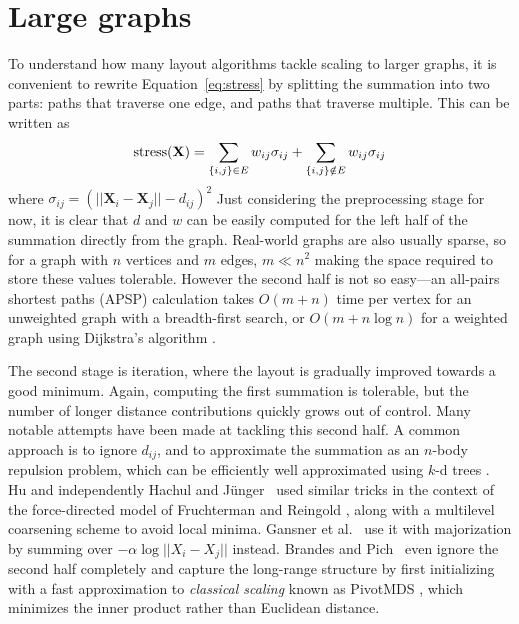 \section{Large graphs}
\label{sec:large_graphs}
To understand how many layout algorithms tackle scaling to larger graphs, it is convenient to rewrite Equation~\eqref{eq:stress} by splitting the summation into two parts: paths that traverse one edge, and paths that traverse multiple.
This can be written as
\begin{equation}
  \text{stress}(\mathbf{X}) = \sum_{\{i,j\}\in E}w_{ij}\sigma_{ij}\\
  + \sum_{\{i,j\}\notin E}w_{ij}\sigma_{ij}
  \label{split stress}
\end{equation}
where $\sigma_{ij} = (||\mathbf{X}_i - \mathbf{X}_j|| - d_{ij})^2$
Just considering the preprocessing stage for now, it is clear that $d$ and $w$ can be easily computed for the left half of the summation directly from the graph. Real-world graphs are also usually sparse, so for a graph with $n$ vertices and $m$ edges, $m \ll n^2$ making the space required to store these values tolerable. However the second half is not so easy---an all-pairs shortest paths (APSP) calculation takes $O(m + n)$ time per vertex for an unweighted graph with a breadth-first search, or $O(m + n\log n)$ for a weighted graph using Dijkstra's algorithm \cite{Cormen2009}.

The second stage is iteration, where the layout is gradually improved towards a good minimum. Again, computing the first summation is tolerable, but the number of longer distance contributions quickly grows out of control. Many notable attempts have been made at tackling this second half. A common approach is to ignore $d_{ij}$, and to approximate the summation as an $n$-body repulsion problem, which can be efficiently well approximated using $k$-d trees \cite{Barnes1986}. Hu \cite{Hu2005} and independently Hachul and J\"unger~\cite{Hachul2004} used similar tricks in the context of the force-directed model of Fruchterman and Reingold \cite{Fruchterman1991}, along with a multilevel coarsening scheme to avoid local minima. Gansner et al.\ \cite{Gansner2013} use it with majorization by summing over $-\alpha \log||X_i - X_j||$ instead. Brandes and Pich~\cite{Brandes2007Eigensolver} even ignore the second half completely and capture the long-range structure by first initializing with a fast approximation to \emph{classical scaling} known as PivotMDS \cite{Brandes2008}, which minimizes the inner product rather than Euclidean distance.


